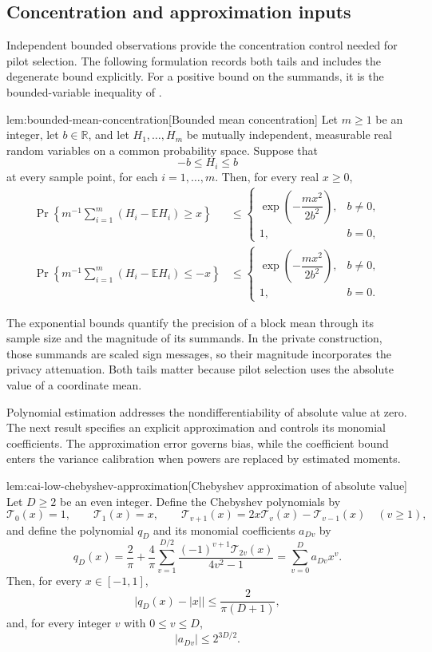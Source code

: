 \documentclass[11pt]{article}
\begin{document}
\subsection{Concentration and approximation inputs}

Independent bounded observations provide the concentration control needed for pilot selection. The following formulation records both tails and includes the degenerate bound explicitly. For a positive bound on the summands, it is the bounded-variable inequality of \citet[Theorem~2]{Hoeffding1963Bounded}.

\begin{theoremv}{lem:bounded-mean-concentration}[Bounded mean concentration]
Let \(m\ge1\) be an integer, let \(b\in\mathbb R\), and let \(H_1,\ldots,H_m\) be mutually independent, measurable real random variables on a common probability space. Suppose that
\[
-b\le H_i\le b
\]
at every sample point, for each \(i=1,\ldots,m\). Then, for every real \(x\ge0\),
\[
\begin{aligned}
\Pr\left\{m^{-1}\sum_{i=1}^m(H_i-\mathbb E H_i)\ge x\right\}
&\le
\begin{cases}
\exp\!\left(-\dfrac{mx^2}{2b^2}\right),& b\ne0,\\
1,& b=0,
\end{cases}\\
\Pr\left\{m^{-1}\sum_{i=1}^m(H_i-\mathbb E H_i)\le -x\right\}
&\le
\begin{cases}
\exp\!\left(-\dfrac{mx^2}{2b^2}\right),& b\ne0,\\
1,& b=0.
\end{cases}
\end{aligned}
\]
\end{theoremv}

The exponential bounds quantify the precision of a block mean through its sample size and the magnitude of its summands. In the private construction, those summands are scaled sign messages, so their magnitude incorporates the privacy attenuation. Both tails matter because pilot selection uses the absolute value of a coordinate mean.

Polynomial estimation addresses the nondifferentiability of absolute value at zero. The next result specifies an explicit approximation and controls its monomial coefficients. The approximation error governs bias, while the coefficient bound enters the variance calibration when powers are replaced by estimated moments.

\begin{theoremv}{lem:cai-low-chebyshev-approximation}[Chebyshev approximation of absolute value]
Let \(D\ge 2\) be an even integer. Define the Chebyshev polynomials by
\[
\mathcal T_0(x)=1,\qquad \mathcal T_1(x)=x,\qquad
\mathcal T_{v+1}(x)=2x\mathcal T_v(x)-\mathcal T_{v-1}(x)
\quad (v\ge 1),
\]
and define the polynomial \(q_D\) and its monomial coefficients \(a_{Dv}\) by
\[
q_D(x)=\frac{2}{\pi}
+\frac{4}{\pi}\sum_{v=1}^{D/2}
\frac{(-1)^{v+1}\mathcal T_{2v}(x)}{4v^2-1}
=\sum_{v=0}^{D}a_{Dv}x^v.
\]
Then, for every \(x\in[-1,1]\),
\[
\bigl|q_D(x)-|x|\bigr|\le \frac{2}{\pi(D+1)},
\]
and, for every integer \(v\) with \(0\le v\le D\),
\[
|a_{Dv}|\le 2^{3D/2}.
\]
\end{theoremv}
\end{document}

